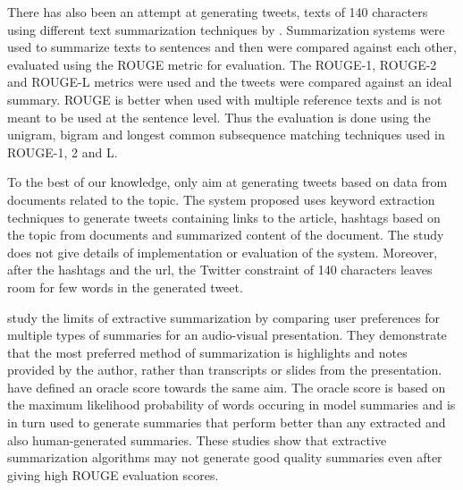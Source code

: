 There has also been an attempt at generating tweets, texts of 140 characters using different text summarization techniques by  . Summarization systems were used to summarize texts to sentences and then were compared against each other, evaluated using the ROUGE metric for evaluation. The ROUGE-1, ROUGE-2 and ROUGE-L metrics were used and the tweets were compared against an ideal summary. ROUGE is better when used with multiple reference texts and is not meant to be used at the sentence level. Thus the evaluation is done using the unigram, bigram and longest common subsequence matching techniques used in ROUGE-1, 2 and L.  

To the best of our knowledge, only  aim at generating tweets based on data from documents related to the topic. The system proposed uses keyword extraction techniques to generate tweets containing links to the article, hashtags based on the topic from documents and summarized content of the document. The study does not give details of implementation or evaluation of the system. Moreover, after the hashtags and the url, the Twitter constraint of 140 characters leaves room for few words in the generated tweet.

 study the limits of extractive summarization by comparing user preferences for multiple types of summaries for an audio-visual presentation. They demonstrate that the most preferred method of summarization is highlights and notes provided by the author, rather than transcripts or slides from the presentation.  have defined an oracle score towards the same aim. The oracle score is based on the maximum likelihood probability of words occuring in model summaries and is in turn used to generate summaries that perform better than any extracted and also human-generated summaries. These studies show that extractive summarization algorithms may not generate good quality summaries even after giving high ROUGE evaluation scores.